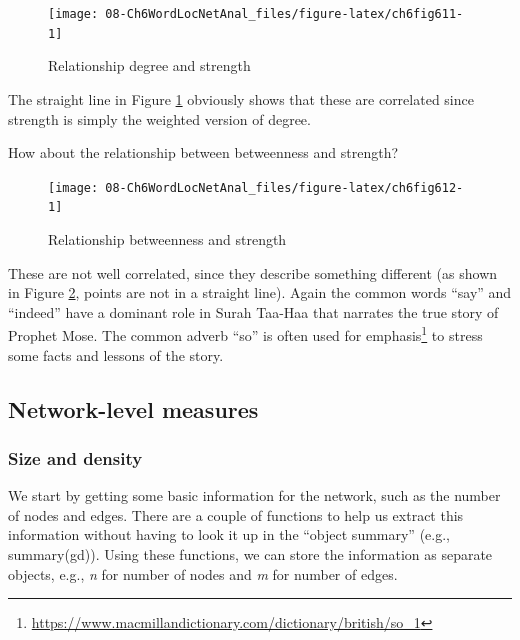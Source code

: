 \documentclass[
]{article}
\begin{document}
\begin{figure}

{\centering \texttt{[image: 08-Ch6WordLocNetAnal\_files/figure-latex/ch6fig611-1]} 

}

\caption{Relationship degree and strength}\label{fig:ch6fig611}
\end{figure}

The straight line in Figure \ref{fig:ch6fig611} obviously shows that these are correlated since strength is simply the weighted version of degree.

How about the relationship between betweenness and strength?

\begin{figure}

{\centering \texttt{[image: 08-Ch6WordLocNetAnal\_files/figure-latex/ch6fig612-1]} 

}

\caption{Relationship betweenness and strength}\label{fig:ch6fig612}
\end{figure}

These are not well correlated, since they describe something different (as shown in Figure \ref{fig:ch6fig612}, points are not in a straight line). Again the common words ``say'' and ``indeed'' have a dominant role in Surah Taa-Haa that narrates the true story of Prophet Mose. The common adverb ``so'' is often used for emphasis\footnote{\url{https://www.macmillandictionary.com/dictionary/british/so_1}} to stress some facts and lessons of the story.

\hypertarget{network-level-measures}{%
\subsection{Network-level measures}\label{network-level-measures}}

\hypertarget{size-and-density}{%
\subsubsection{Size and density}\label{size-and-density}}

We start by getting some basic information for the network, such as the number of nodes and edges. There are a couple of functions to help us extract this information without having to look it up in the ``object summary'' (e.g., summary(gd)). Using these functions, we can store the information as separate objects, e.g., \emph{n} for number of nodes and \emph{m} for number of edges.
\end{document}
